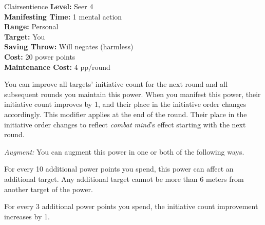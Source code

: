 {Clairsentience}
{
	\textbf{Level:}
	Seer 4\\
	\textbf{Manifesting Time:}
	1 mental action\\
	\textbf{Range:}
	Personal\\
	\textbf{Target:}
	You\\
	\textbf{Saving Throw:}
	Will negates (harmless)\\
	\textbf{Cost:}
	20 power points\\
	\textbf{Maintenance Cost:}
	4 pp/round\\
}
{
	You can improve all targets' initiative count for the next round and all subsequent rounds you maintain this power. When you manifest this power, their initiative count improves by 1, and their place in the initiative order changes accordingly. This modifier applies at the end of the round. Their place in the initiative order changes to reflect \emph{combat mind}'s effect starting with the next round.

	\textit{Augment:} You can augment this power in one or both of the following ways.
	\begin{enumerate*}
		\item For every 10 additional power points you spend, this power can affect an additional target. Any additional target cannot be more than 6 meters from another target of the power.
		\item For every 3 additional power points you spend, the initiative count improvement increases by 1.
	\end{enumerate*}
}